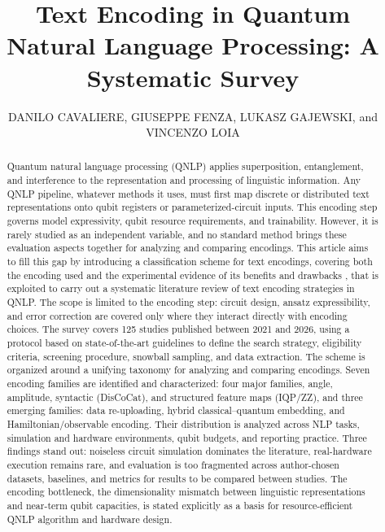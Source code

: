 \documentclass{ieeeaccess}
\begin{document}
 
\title{Text Encoding in Quantum Natural Language Processing: A Systematic Survey}

\author{\uppercase{Danilo Cavaliere}, \uppercase{Giuseppe Fenza}, \uppercase{Lukasz Gajewski}, and \uppercase{Vincenzo Loia}}

\address[1]{Department of Management \& Innovation Systems, Università degli Studi di Salerno, Italy}



\begin{abstract}
Quantum natural language processing (QNLP) applies superposition, entanglement, and interference to the representation and processing of linguistic information. Any QNLP pipeline, whatever methods it uses, must first map discrete or distributed text representations onto qubit registers or parameterized-circuit inputs. This encoding step governs model expressivity, qubit resource requirements, and trainability. However, it is rarely studied as an independent variable, and no standard method brings these evaluation aspects together for analyzing and comparing encodings. This article aims to fill this gap by introducing a classification scheme for text encodings, covering both the encoding used and the experimental evidence 
of its benefits and drawbacks
, that is exploited to 
carry out a systematic literature review of text encoding strategies in QNLP. The scope is limited to the encoding step: circuit design, ansatz expressibility, and error correction are covered only where they interact directly with encoding choices. The survey covers 125 studies published between 2021 and 2026, using a protocol based on state-of-the-art guidelines to define the search strategy, eligibility criteria, screening procedure, snowball sampling, and data extraction. The scheme is organized around a unifying taxonomy for analyzing and comparing encodings. Seven encoding families are identified and characterized: four major families, angle, amplitude, syntactic (DisCoCat), and structured feature maps (IQP/ZZ), and three emerging families: data re-uploading, hybrid classical--quantum embedding, and Hamiltonian/observable encoding. Their distribution is analyzed across NLP tasks, simulation and hardware environments, qubit budgets, and reporting practice. Three findings stand out: noiseless circuit simulation dominates the literature, real-hardware execution remains rare, and evaluation is too fragmented across author-chosen datasets, baselines, and metrics for results to be compared between studies. The encoding bottleneck, the dimensionality mismatch between linguistic representations and near-term qubit capacities, is stated explicitly as a basis for resource-efficient QNLP algorithm and hardware design.
\end{abstract}
\end{document}
